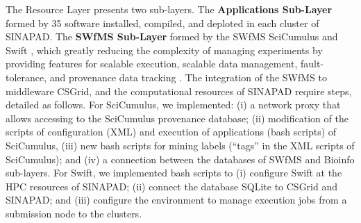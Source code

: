 The Resource Layer presents two sub-layers. The \textbf{Applications Sub-Layer} formed by 35 software installed, compiled, and deploted in each cluster of SINAPAD. The \textbf{SWfMS Sub-Layer} formed by the SWfMS SciCumulus \cite{5557969} and Swift \cite{WILDE2011633}, which greatly reducing the complexity of managing experiments by providing features for scalable execution, scalable data management, fault-tolerance, and provenance data tracking \cite{mattoso2010}. The integration of the SWfMS to middleware CSGrid, and the computational resources of SINAPAD require steps, detailed as follows. For SciCumulus, we implemented: (i) a network proxy that allows accessing to the SciCumulus provenance database; (ii) modification of the scripts of configuration (XML) and execution of applications (bash scripts) of SciCumulus, (iii) new bash scripts for mining labels (“tags” in the XML scripts of SciCumulus); and (iv) a connection between the databases of SWfMS and Bioinfo sub-layers. For Swift, we implemented bash scripts to (i) configure Swift at the HPC resources of SINAPAD; (ii) connect the database SQLite to CSGrid and SINAPAD; and (iii) configure the environment to manage execution jobs from a submission node to the clusters.

\vspace{-10px}

